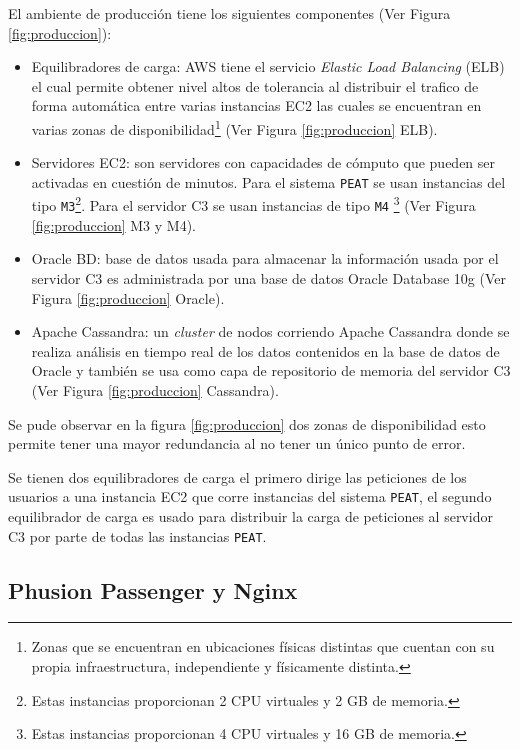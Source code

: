 
El ambiente de producción tiene los siguientes componentes (Ver Figura \ref{fig:produccion}):
\begin{itemize}
\item Equilibradores de carga: AWS tiene el servicio \textit{Elastic Load Balancing}
  (ELB) el cual permite obtener nivel altos de tolerancia al distribuir el trafico
  de forma automática entre varias instancias EC2 las cuales se encuentran en
  varias zonas de disponibilidad\footnote{Zonas que se encuentran en
    ubicaciones físicas distintas que cuentan con su propia infraestructura,
    independiente y físicamente distinta.} (Ver Figura \ref{fig:produccion} ELB).
\item Servidores EC2: son servidores con capacidades de cómputo que pueden ser
  activadas en cuestión de minutos. Para el sistema \texttt{PEAT} se usan instancias
  del tipo \texttt{M3}\footnote{Estas instancias proporcionan 2 CPU virtuales y
    2 GB de memoria.}. Para el servidor C3 se usan instancias de tipo \texttt{M4}
  \footnote{Estas instancias proporcionan 4 CPU virtuales y 16 GB de memoria.}
  (Ver Figura \ref{fig:produccion} M3 y M4).
\item Oracle BD: base de datos usada para almacenar la información usada
  por el servidor C3 es administrada por una base de datos Oracle Database 10g
  (Ver Figura \ref{fig:produccion} Oracle).
\item Apache Cassandra: un \textit{cluster} de nodos corriendo Apache Cassandra
  donde se realiza análisis en tiempo real de los datos contenidos en la
  base de datos de Oracle y también se usa como capa de repositorio de memoria del servidor C3
  (Ver Figura \ref{fig:produccion} Cassandra).
\end{itemize}

Se pude observar en la figura \ref{fig:produccion} dos zonas de disponibilidad
esto permite tener una mayor redundancia al no tener un único punto de error.

Se tienen dos equilibradores de carga el primero dirige las peticiones de los
usuarios a una instancia EC2 que corre instancias del sistema \texttt{PEAT},
el segundo equilibrador de carga es usado para distribuir la carga de peticiones
al servidor C3 por parte de todas las instancias \texttt{PEAT}.

\subsection{Phusion Passenger y Nginx}

